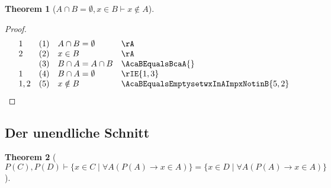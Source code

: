 \documentclass{book}
\theoremstyle{plain}
\newtheorem{theorem}{Theorem}
\theoremstyle{remark}
\theoremstyle{definition}
\begin{document}
\label{AcaBEqualsEmptysetwxInBImpxNotinA}
\begin{theorem}[\(A\cap B = \emptyset, x\in B\vdash x\notin A\)]
\end{theorem}
\begin{proof}
    \[
	\begin{array}{llll}
            1 & (1) & A\cap B = \emptyset & \rA \\
	    2 & (2) & x\in B & \rA \\
              & (3) & B \cap A = A \cap B & \AcaBEqualsBcaA{} \\
            1 & (4) & B \cap A = \emptyset & \rIE{1,3} \\
            1,2 & (5) & x\notin B & \AcaBEqualsEmptysetwxInAImpxNotinB{5,2} \\
	\end{array}
    \]
\end{proof}

\subsection{Der unendliche Schnitt}

\label{LpPLpCRpwPLpDRpImpLbxInCMidFaALpPLpARpToxInARpRbEqualsLbxInDMidFaALpPLpARpToxInARpRb}
\begin{theorem}[\(P(C),P(D)\vdash \{ x \in C \mid \forall A (P(A) \rightarrow x \in A)\} = \{ x \in D \mid \forall A (P(A) \rightarrow x \in A) \}\)]
\end{theorem}
\end{document}
